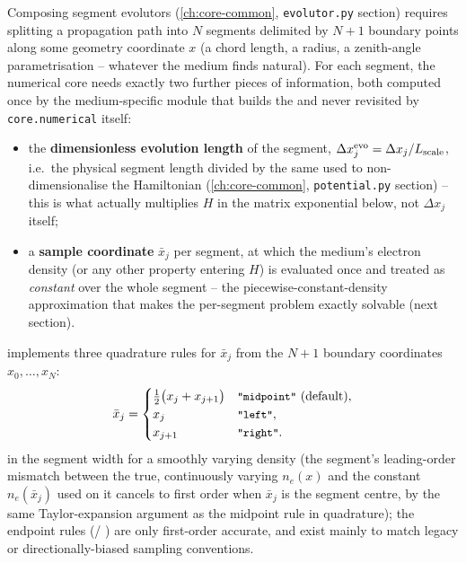 \begin{theorybox}
Composing segment evolutors (\cref{ch:core-common}, \texttt{evolutor.py}
section) requires splitting a propagation path into $N$ segments delimited
by $N+1$ boundary points along some geometry coordinate $x$ (a chord
length, a radius, a zenith-angle parametrisation -- whatever the medium
finds natural). For each segment, the numerical core needs exactly two
further pieces of information, both computed once by the medium-specific
module that builds the  and never revisited by
\texttt{core.numerical} itself:
\begin{itemize}
  \item the \textbf{dimensionless evolution length} of the segment,
    $\Delta x^{\rm evo}_j = \Delta x_j / L_{\rm scale}$, i.e.\ the physical
    segment length divided by the same  used to
    non-dimensionalise the Hamiltonian (\cref{ch:core-common},
    \texttt{potential.py} section) -- this is what actually multiplies
    $H$ in the matrix exponential below, not $\Delta x_j$ itself;
  \item a \textbf{sample coordinate} $\bar x_j$ per segment, at which the
    medium's electron density (or any other property entering $H$) is
    evaluated once and treated as \emph{constant} over the whole segment
    -- the piecewise-constant-density approximation that makes the
    per-segment problem exactly solvable (next section).
\end{itemize}
 implements three quadrature rules for
$\bar x_j$ from the $N+1$ boundary coordinates $x_0,\dots,x_N$:
\begin{equation}
  \bar x_j =
  \begin{cases}
    \tfrac12\bigl(x_j+x_{j+1}\bigr) & \text{\code{"midpoint"}\ (default)}, \\
    x_j & \text{\code{"left"}}, \\
    x_{j+1} & \text{\code{"right"}}.
  \end{cases}
\end{equation}
 in the segment
width for a smoothly varying density (the segment's leading-order
mismatch between the true, continuously varying $n_e(x)$ and the
constant $n_e(\bar x_j)$ used on it cancels to first order when $\bar x_j$
is the segment centre, by the same Taylor-expansion argument as the
midpoint rule in quadrature); the endpoint rules (/
) are only first-order accurate, and exist mainly to match
legacy or directionally-biased sampling conventions.
\end{theorybox}

